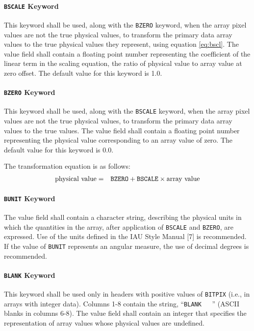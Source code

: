    \paragraph{{\tt BSCALE} Keyword}
 This keyword shall be used, along with the {\tt BZERO}
 keyword, when the array pixel values are not the true
 physical values, to transform the 
 primary data array values to
 the true physical values they represent, using equation \ref{eq:bscl}.
 The value field shall contain a floating point number representing the
 coefficient of the linear term in the scaling equation, the
 ratio of physical value to array value 
 at zero offset.  The default value for this keyword is 1.0.  
 
  \paragraph{{\tt BZERO} Keyword}
 This keyword shall be used, along with the {\tt BSCALE}
 keyword, when the array pixel values are not the true
 physical values, to transform the primary data array values to
 the true values.   The value field shall contain a floating
 point number representing the physical value
 corresponding to an array value of zero.  The default value for this 
 keyword is 0.0.

 The transformation equation is as follows:
\begin{eqnarray}  
  \mbox{physical value} & = & \mbox{{\tt BZERO}} + \mbox{{\tt
BSCALE}}
                              \times \mbox{array value} \label{eq:bscl}
\end{eqnarray}
  
   \paragraph{{\tt BUNIT} Keyword}
 The value field shall contain a character 
 string,
 describing the physical units in which the quantities 
 in the array, after application of {\tt BSCALE} 
 and {\tt BZERO},
 are expressed.  Use of the units defined in the IAU
 Style Manual [7] is recommended. 
 If the value of {\tt BUNIT} represents an 
 angular measure, the
 use of decimal degrees is recommended. 

   \paragraph{{\tt BLANK} Keyword}
 This keyword shall be used only in headers with
 positive values of {\tt BITPIX} 
 (i.e., in arrays with integer data).
 Columns 1-8 contain the string, ``\verb*+BLANK   +'' (ASCII blanks in
 columns 6-8). The value field shall contain an integer that
 specifies the representation of array values 
 whose physical values are undefined. 
  
